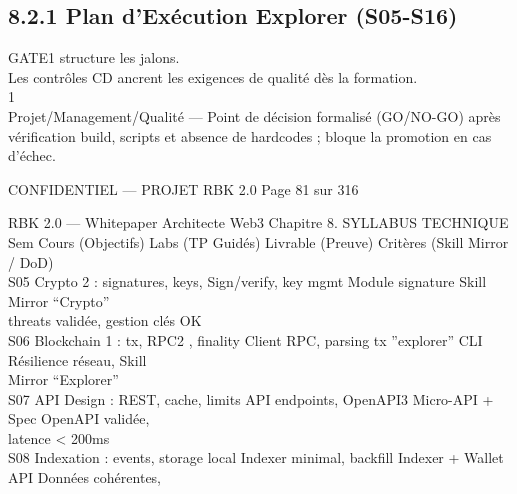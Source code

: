 \subsection{8.2.1 Plan d’Exécution Explorer (S05-S16)}
GATE1 structure les jalons.\\
Les contrôles CD ancrent les exigences de qualité dès la formation.\\
\vspace{0.5em}
\vspace{0.5em}
\vspace{0.5em}
\vspace{0.5em}
1\\
Projet/Management/Qualité — Point de décision formalisé (GO/NO-GO) après vérification build, scripts et absence de hardcodes ; bloque la promotion en cas\\
d’échec.\\
\vspace{0.5em}
\vspace{0.5em}
\begin{confidential}CONFIDENTIEL — PROJET RBK 2.0                                               Page 81 sur 316\end{confidential}
RBK 2.0 — Whitepaper Architecte Web3                                                                                     Chapitre 8. SYLLABUS TECHNIQUE\\
\vspace{0.5em}
\vspace{0.5em}
Sem     Cours (Objectifs)                    Labs (TP Guidés)                   Livrable (Preuve)        Critères (Skill Mirror\\
/ DoD)\\
S05     Crypto 2 : signatures, keys,         Sign/verify, key mgmt              Module signature         Skill Mirror “Crypto”\\
threats                                                                                          validée, gestion clés OK\\
S06     Blockchain 1 : tx, RPC2 , finality   Client RPC, parsing tx             ”explorer” CLI           Résilience réseau, Skill\\
Mirror “Explorer”\\
S07     API Design : REST, cache, limits     API endpoints, OpenAPI3            Micro-API + Spec         OpenAPI validée,\\
latence \textless{} 200ms\\
S08     Indexation : events, storage local   Indexer minimal, backfill          Indexer + Wallet API     Données cohérentes,\\
